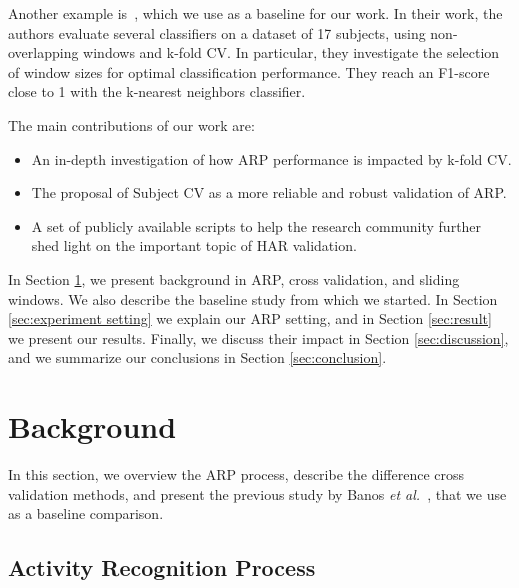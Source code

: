 \documentclass[sigconf]{acmart}
\begin{document}
Another example is~\cite{banos2014window}, which we use as a baseline for our work. In their work, the authors evaluate several classifiers on 
a dataset of 17 subjects, using non-overlapping windows and k-fold CV. 
In particular, they investigate the selection of window sizes for 
optimal classification performance. They reach an F1-score close to 1 with the k-nearest neighbors classifier.
 
The main contributions of our work are:

\begin{itemize}

\item An in-depth investigation of how ARP performance is impacted by k-fold CV.

\item The proposal of Subject CV as a more reliable and robust validation of ARP.

\item A set of publicly available scripts to help the research community further shed light on the important topic of HAR validation.

\end{itemize}



In Section \ref{sec:background}, we present 
background in ARP, cross validation, and sliding windows. We also describe the baseline study from which we started. In Section 
\ref{sec:experiment setting} we explain our ARP setting, and in Section 
\ref{sec:result} we present our results. Finally, we discuss their impact in Section \ref{sec:discussion}, and 
we summarize our conclusions in Section \ref{sec:conclusion}.  


\section{Background} \label{sec:background}
In this section, we overview the ARP process, describe the difference cross validation methods, and present the previous study  by Banos \emph{et al.}~\cite{banos2014window}, that we use as a baseline comparison.

\subsection{Activity Recognition Process}\label{subsec:ARP}
\end{document}
